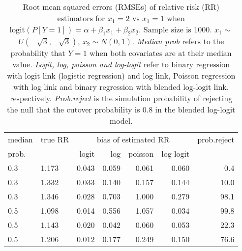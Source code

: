 \documentclass[12pt,a4paper]{article}
\begin{document}
\begin{table}[H] 
\small\sf\centering 
\caption{Root mean squared errors (RMSEs) of relative risk (RR) estimators for $x_1=2$ vs $x_1=1$ when $\mbox{logit}(P[Y=1])=\alpha+\beta_1 x_1 + \beta_2 x_2$. Sample size is 1000. $x_1 \sim $$U(-\sqrt{3},-\sqrt{3})$, $x_2 \sim N(0,1)$. {\it Median prob} refers to the probability that $Y=1$ when both covariates are at their median value. {\it Logit, log, poisson and log-logit} refer to binary regression with logit link (logistic regression) and log link, Poisson regression with log link and binary regression with blended log-logit link, respectively. {\it Prob.reject} is the simulation probability of rejecting the null that the cutover probability is $0.8$ in the blended log-logit model.} 
\begin{tabular}{llrrrrr} 
\toprule 
median & true RR & \multicolumn{4}{c}{bias of estimated RR} & prob.reject \\ 
prob. & & logit & log & poisson & log-logit  & \\ \midrule 
0.3 & 1.173 & 0.043 & 0.059 & 0.061 & 0.060 &  0.4 \\  
0.3 & 1.332 & 0.033 & 0.140 & 0.157 & 0.144 & 10.0 \\  
0.3 & 1.346 & 0.028 & 0.703 & 1.000 & 0.279 & 98.1 \\  
0.5 & 1.098 & 0.014 & 0.556 & 1.057 & 0.034 & 99.8 \\  
0.5 & 1.143 & 0.020 & 0.042 & 0.060 & 0.053 & 22.3 \\  
0.5 & 1.206 & 0.012 & 0.177 & 0.249 & 0.150 & 76.6 \\  
\bottomrule 
\end{tabular} 
\end{table} 
\end{document}
